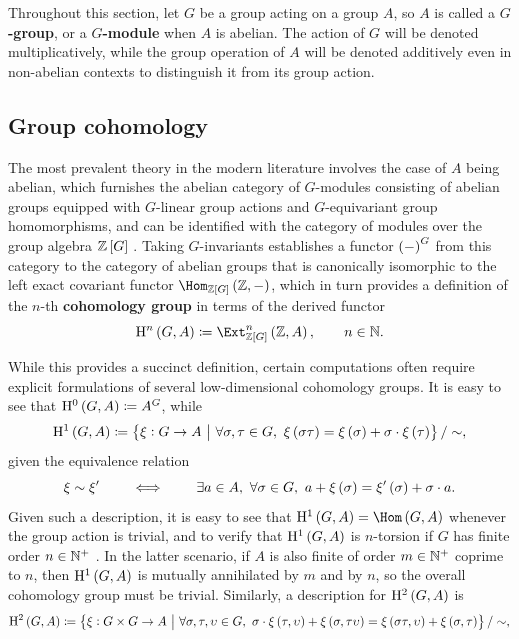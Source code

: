 Throughout this section, let $ G $ be a group acting on a group $ A $, so $ A $ is called a \textbf{$ G $-group}, or a \textbf{$ G $-module} when $ A $ is abelian. The action of $ G $ will be denoted multiplicatively, while the group operation of $ A $ will be denoted additively even in non-abelian contexts to distinguish it from its group action.

\subsection{Group cohomology}

The most prevalent theory in the modern literature involves the case of $ A $ being abelian, which furnishes the abelian category of $ G $-modules consisting of abelian groups equipped with $ G $-linear group actions and $ G $-equivariant group homomorphisms, and can be identified with the category of modules over the group algebra $ \ZZ\sbr{G} $ \cite[Section VII.1]{Ser80}. Taking $ G $-invariants establishes a functor $ \br{-}^G $ from this category to the category of abelian groups that is canonically isomorphic to the left exact covariant functor $ \Hom_{\ZZ\sbr{G}}\br{\ZZ, -} $, which in turn provides a definition of the $ n $-th \textbf{cohomology group} in terms of the derived functor
$$ \H^n\br{G, A} \coloneqq \Ext_{\ZZ\sbr{G}}^n\br{\ZZ, A}, \qquad n \in \NN. $$

While this provides a succinct definition, certain computations often require explicit formulations of several low-dimensional cohomology groups. It is easy to see that $ \H^0\br{G, A} \coloneqq A^G $, while
$$ \H^1\br{G, A} \coloneqq \cbr{\xi : G \to A \st \forall \sigma, \tau \in G, \ \xi\br{\sigma\tau} = \xi\br{\sigma} + \sigma \cdot \xi\br{\tau}} / \sim, $$
given the equivalence relation
$$ \xi \sim \xi' \qquad \iff \qquad \exists a \in A, \ \forall \sigma \in G, \ a + \xi\br{\sigma} = \xi'\br{\sigma} + \sigma \cdot a. $$
Given such a description, it is easy to see that $ \H^1\br{G, A} = \Hom\br{G, A} $ whenever the group action is trivial, and to verify that $ \H^1\br{G, A} $ is $ n $-torsion if $ G $ has finite order $ n \in \mathbb{N}^+ $ \cite[Exercise B.1]{Sil09}. In the latter scenario, if $ A $ is also finite of order $ m \in \mathbb{N}^+ $ coprime to $ n $, then $ \H^1\br{G, A} $ is mutually annihilated by $ m $ and by $ n $, so the overall cohomology group must be trivial. Similarly, a description for $ \H^2\br{G, A} $ is
$$ \H^2\br{G, A} \coloneqq \cbr{\xi : G \times G \to A \st \forall \sigma, \tau, \upsilon \in G, \ \sigma \cdot \xi\br{\tau, \upsilon} + \xi\br{\sigma, \tau\upsilon} = \xi\br{\sigma\tau, \upsilon} + \xi\br{\sigma, \tau}} / \sim, $$

